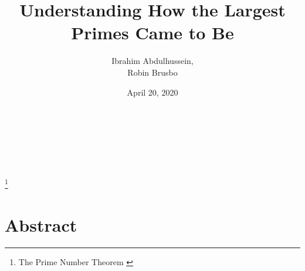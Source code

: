 \documentclass[a4paper, 12pt]{article}
\title{Understanding How the Largest Primes Came to Be}
\author{Ibrahim Abdulhussein, \\ Robin Brusbo}
\date{April 20, 2020}
\begin{document}
\makeatletter

\begin{titlepage}
    \thispagestyle{fancy}
    \renewcommand{\headrulewidth}{0pt}
    \renewcommand{\footrulewidth}{0pt}
    \cfoot{}
    \hbox{}\vfill
    \begin{center}
        {\LARGE\@title}\\[2em]
        {\large\@author}\\[1em]
        {\large\@date}\\[6em]
        \\
        \footnote{The Prime Number Theorem \cite{theorem:prime_num}}
    \end{center}
    \vspace{3cm}\vfill
\end{titlepage}

\makeatother

\newpage
\section*{Abstract}
\end{document}
